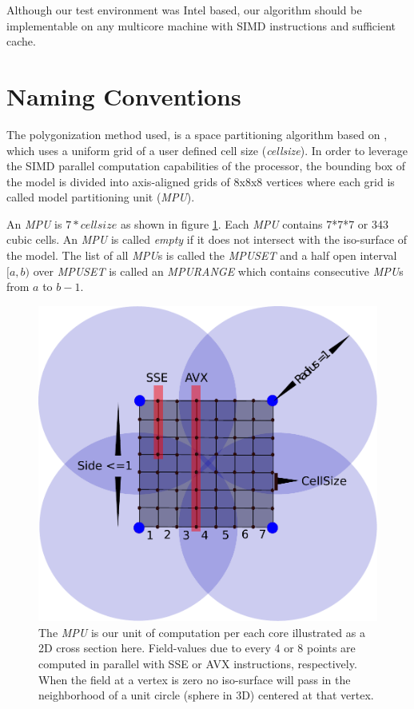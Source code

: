 Although our test environment was Intel based, our algorithm should be implementable on any
multicore machine with SIMD instructions and sufficient cache.

\section{Naming Conventions}\label{sec:naming}
The polygonization method used, is a space partitioning algorithm based on \cite{Wyvill1986}, which uses a  uniform grid of a user 
defined cell size (\textit{cellsize}). In order to leverage the SIMD parallel computation capabilities of the processor, the bounding 
box of the model is divided into axis-aligned grids of 8x8x8 vertices where each grid is called  model partitioning unit (\textit{MPU}). 

An \textit{MPU} is $7*cellsize$ as shown in figure \ref{fig:MPU}. Each \textit{MPU} contains 7*7*7 or 343 cubic cells. An \textit{MPU}  is called \textit{empty} 
if it does not intersect with the iso-surface of the model. 
The list of all \textit{MPU}s is called the \textit{MPUSET} and a half open interval 
$[a, b)$ over \textit{MPUSET} is called an \textit{MPURANGE} which contains consecutive \textit{MPU}s from $a$ to $b-1$.
 
\begin{figure}[H]
  \centering
  \includegraphics[width=0.7\linewidth]{figures/cpupoly/MPU.pdf}
  \caption{\label{fig:MPU}
  {The \textit{MPU} is our unit of computation per each core illustrated as a 2D cross section here. 
  Field-values due to every 4 or 8 points are computed in parallel with SSE or AVX instructions, respectively. 
  When the field at a vertex is zero no iso-surface will pass in the neighborhood of a unit circle (sphere in 3D) centered at that vertex.}
}
\end{figure}


